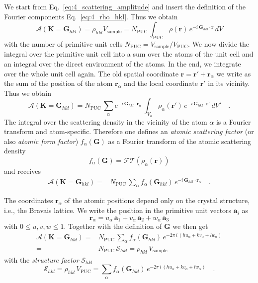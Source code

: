 We start from Eq.~\ref{eq:4_scattering_amplitude} and insert the definition of the Fourier components Eq.~\ref{eq:4_rho_hkl}. Thus we obtain
\begin{equation}
\mathcal{A}(\mathbf{K} = \mathbf{G}_{hkl} ) 
= \rho_{hkl} V_\text{sample}
= N_\text{PUC} \, \int_\text{PUC}    \rho(\mathbf{r})\, e^{-i \, \mathbf{G}_{hkl} \cdot \mathbf{r}} \, dV 
\end{equation}
with the number of primitive unit cells $ N_\text{PUC} = V_\text{sample} / V_\text{PUC}$.
We now divide the integral over the primitive unit cell into a sum over the atoms of the unit cell and an integral over the direct environment of the atoms. In the end, we integrate over the whole unit cell again. The old spatial coordinate $\mathbf{r} = \mathbf{r}' + \mathbf{r}_\alpha$ we write as the sum of the position of the atom $\mathbf{r}_\alpha$ and the local coordinate $\mathbf{r}'$ in its vicinity. Thus we obtain
\begin{equation}
\mathcal{A}(\mathbf{K} = \mathbf{G}_{hkl} ) 
= N_\text{PUC}  \, 
\sum_\alpha e^{-i \, \mathbf{G}_{hkl} \cdot \mathbf{r}_\alpha} \, \int_{V_\alpha}  
 \rho_\alpha(\mathbf{r'})\, e^{-i \, \mathbf{G}_{hkl} \cdot \mathbf{r'}} \, dV' \quad .
\end{equation}
The integral over the scattering density in the vicinity of the atom $\alpha$ is a Fourier transform and atom-specific. Therefore one defines an \emph{atomic scattering factor} (or also \emph{atomic form factor}) $f_\alpha ( \mathbf{G} )$ as a Fourier transform of the atomic scattering density
\begin{equation}
  f_\alpha ( \mathbf{G} ) = \mathcal{FT} (\rho_\alpha(\mathbf{r}))
\end{equation}
and receives
\begin{align}
  \mathcal{A}(\mathbf{K} = \mathbf{G}_{hkl} ) 
  = &
   N_\text{PUC} \, 
  \sum_\alpha f_\alpha ( \mathbf{G}_{hkl} ) \, e^{-i \, \mathbf{G}_{hkl} \cdot \mathbf{r}_\alpha}   \quad .
  \end{align}

The coordinates $\mathbf{r}_\alpha$ of the atomic positions depend only on the crystal structure, i.e., the Bravais lattice. We write the position in the primitive unit vectors $\mathbf{a}_i$ as
\begin{equation}
\mathbf{r}_\alpha = u_\alpha \, \mathbf{a}_1 + v_\alpha \, \mathbf{a}_2 + w_\alpha \, \mathbf{a}_3
\end{equation}
with $0 \le u,v,w \le 1$. Together with the definition of $ \mathbf{G}$ we then get 
\begin{align}
\mathcal{A}(\mathbf{K} = \mathbf{G}_{hkl} ) 
 = &
  N_\text{PUC}  \, 
\sum_\alpha f_\alpha ( \mathbf{G}_{hkl} ) \, e^{-2 \pi \, i \, ( h u_\alpha + k v_\alpha + l w_\alpha ) } \\
 = &
 N_\text{PUC} \, \mathcal{S}_{hkl} = \rho_{hkl} \, V_\text{sample} 
\end{align}
with the \emph{structure factor} $\mathcal{S}_{hkl} $
\begin{equation}
  \mathcal{S}_{hkl} = \rho_{hkl} \, V_\text{PUC} = \sum_\alpha f_\alpha ( \mathbf{G}_{hkl} ) \, e^{-2 \pi \, i \, ( h u_\alpha + k v_\alpha + l w_\alpha ) }  \quad .
\end{equation}



